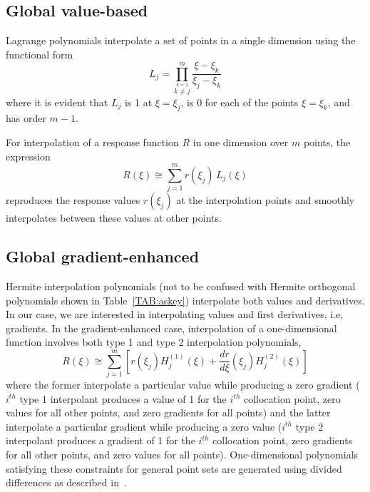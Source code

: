 \subsection{Global value-based} \label{uq:expansion:interp:Lagrange}

Lagrange polynomials interpolate a set of points in a single dimension
using the functional form
\begin{equation}
L_j = \prod_{\stackrel{\scriptstyle k=1}{k \ne j}}^m 
\frac{\xi - \xi_k}{\xi_j - \xi_k} \label{eq:lagrange_poly_1d}
\end{equation}
where it is evident that $L_j$ is 1 at $\xi = \xi_j$, is 0 for each of
the points $\xi = \xi_k$, and has order $m - 1$.

For interpolation of a response function $R$ in one dimension over $m$
points, the expression
\begin{equation}
R(\xi) \cong \sum_{j=1}^m r(\xi_j)\,L_j(\xi) \label{eq:lagrange_interp_1d}
\end{equation}
reproduces the response values $r(\xi_j)$ at the interpolation points
and smoothly interpolates between these values at other points.

\subsection{Global gradient-enhanced} \label{uq:expansion:interp:Hermite}

Hermite interpolation polynomials (not to be confused with Hermite
orthogonal polynomials shown in Table~\ref{TAB:askey}) interpolate
both values and derivatives.  In our case, we are interested in
interpolating values and first derivatives, i.e, gradients.  In the
gradient-enhanced case, interpolation of a one-dimensional function
involves both type 1 and type 2 interpolation polynomials,
\begin{equation}
R(\xi) \cong \sum_{j=1}^{m} \left[ r(\xi_j) H_j^{(1)}(\xi) + 
  \frac{dr}{d\xi}(\xi_j) H_j^{(2)}(\xi) \right]
\end{equation}
where the former interpolate a particular value while producing a zero
gradient ($i^{th}$ type 1 interpolant produces a value of 1 for the
$i^{th}$ collocation point, zero values for all other points, and zero
gradients for all points) and the latter interpolate a particular
gradient while producing a zero value ($i^{th}$ type 2 interpolant
produces a gradient of 1 for the $i^{th}$ collocation point, zero
gradients for all other points, and zero values for all points).
One-dimensional polynomials satisfying these constraints for general
point sets are generated using divided differences as described
in~\cite{Burk11}.

